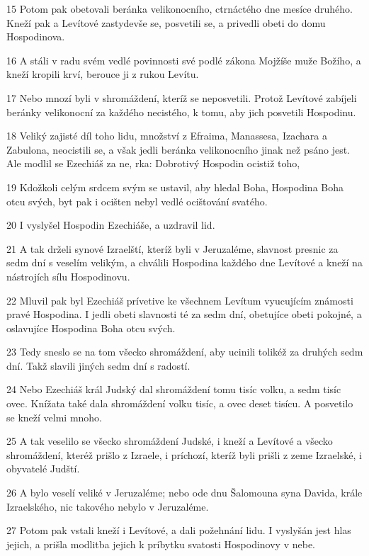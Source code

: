 \par 15 Potom pak obetovali beránka velikonocního, ctrnáctého dne mesíce druhého. Kneží pak a Levítové zastydevše se, posvetili se, a privedli obeti do domu Hospodinova.
\par 16 A stáli v radu svém vedlé povinnosti své podlé zákona Mojžíše muže Božího, a kneží kropili krví, berouce ji z rukou Levítu.
\par 17 Nebo mnozí byli v shromáždení, kteríž se neposvetili. Protož Levítové zabíjeli beránky velikonocní za každého necistého, k tomu, aby jich posvetili Hospodinu.
\par 18 Veliký zajisté díl toho lidu, množství z Efraima, Manassesa, Izachara a Zabulona, neocistili se, a však jedli beránka velikonocního jinak než psáno jest. Ale modlil se Ezechiáš za ne, rka: Dobrotivý Hospodin ocistiž toho,
\par 19 Kdožkoli celým srdcem svým se ustavil, aby hledal Boha, Hospodina Boha otcu svých, byt pak i ocišten nebyl vedlé ocištování svatého.
\par 20 I vyslyšel Hospodin Ezechiáše, a uzdravil lid.
\par 21 A tak drželi synové Izraelští, kteríž byli v Jeruzaléme, slavnost presnic za sedm dní s veselím velikým, a chválili Hospodina každého dne Levítové a kneží na nástrojích sílu Hospodinovu.
\par 22 Mluvil pak byl Ezechiáš prívetive ke všechnem Levítum vyucujícím známosti pravé Hospodina. I jedli obeti slavnosti té za sedm dní, obetujíce obeti pokojné, a oslavujíce Hospodina Boha otcu svých.
\par 23 Tedy sneslo se na tom všecko shromáždení, aby ucinili tolikéž za druhých sedm dní. Takž slavili jiných sedm dní s radostí.
\par 24 Nebo Ezechiáš král Judský dal shromáždení tomu tisíc volku, a sedm tisíc ovec. Knížata také dala shromáždení volku tisíc, a ovec deset tisícu. A posvetilo se kneží velmi mnoho.
\par 25 A tak veselilo se všecko shromáždení Judské, i kneží a Levítové a všecko shromáždení, kteréž prišlo z Izraele, i príchozí, kteríž byli prišli z zeme Izraelské, i obyvatelé Judští.
\par 26 A bylo veselí veliké v Jeruzaléme; nebo ode dnu Šalomouna syna Davida, krále Izraelského, nic takového nebylo v Jeruzaléme.
\par 27 Potom pak vstali kneží i Levítové, a dali požehnání lidu. I vyslyšán jest hlas jejich, a prišla modlitba jejich k príbytku svatosti Hospodinovy v nebe.

